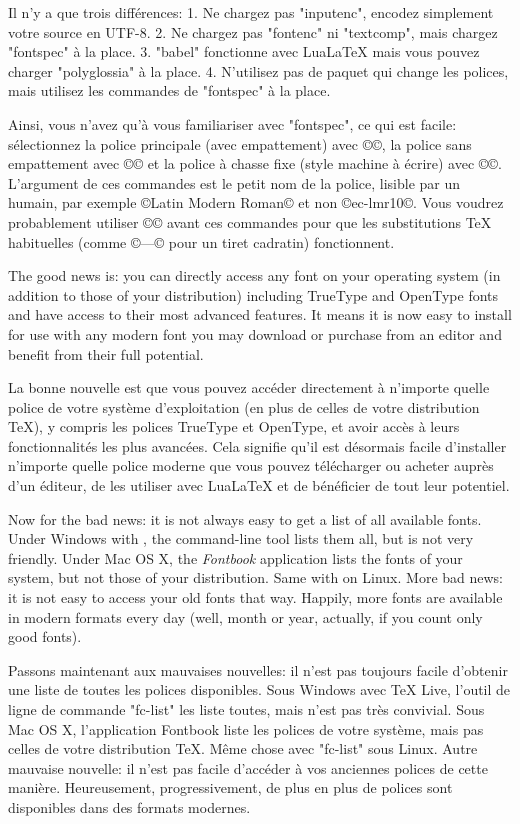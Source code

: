 \documentclass{lltxdoc}
\begin{document}
Il n'y a que trois différences:
1. Ne chargez pas "inputenc", encodez simplement votre source en UTF-8.
2. Ne chargez pas "fontenc" ni "textcomp", mais chargez "fontspec" à la place.
3. "babel" fonctionne avec LuaLaTeX mais vous pouvez charger "polyglossia" à la place.
4. N'utilisez pas de paquet qui change les polices, mais utilisez les commandes de "fontspec" à la place.

Ainsi, vous n'avez qu'à vous familiariser avec "fontspec", ce qui est facile: sélectionnez la police principale (avec empattement) avec ©\setmainfont©, la police sans empattement avec ©\setsansfont© et la police à chasse fixe (style machine à écrire) avec ©\setmonofont©. L'argument de ces commandes est le petit nom de la police, lisible par un humain, par exemple ©Latin Modern Roman© et non ©ec-lmr10©. Vous voudrez probablement utiliser ©© avant ces commandes pour que les substitutions TeX habituelles (comme ©---© pour un tiret cadratin) fonctionnent.

The good news is: you can directly access any font on your operating system
(in addition to those of your \tex distribution) including TrueType and
OpenType fonts and have access to their most advanced features. It means it
is now easy to install for use with \lualatex any modern font you may download
or purchase from an editor and benefit from their full potential.

La bonne nouvelle est que vous pouvez accéder directement à n'importe quelle police de votre système d'exploitation (en plus de celles de votre distribution TeX), y compris les polices TrueType et OpenType, et avoir accès à leurs fonctionnalités les plus avancées. Cela signifie qu'il est désormais facile d'installer n'importe quelle police moderne que vous pouvez télécharger ou acheter auprès d'un éditeur, de les utiliser avec LuaLaTeX et de bénéficier de tout leur potentiel.

Now for the bad news: it is not always easy to get a list of all available
fonts. Under Windows with \texlive, the command-line tool  lists
them all, but is not very friendly. Under Mac OS X, the \emph{Fontbook}
application lists the fonts of your system, but not those of your \tex
distribution. Same with  on Linux. More bad news: it is not easy
to access your old fonts that way. Happily, more fonts are available in modern
formats every day (well, month or year, actually, if you count only good
fonts).

Passons maintenant aux mauvaises nouvelles: il n'est pas toujours facile d'obtenir une liste de toutes les polices disponibles. Sous Windows avec TeX Live, l'outil de ligne de commande "fc-list" les liste toutes, mais n'est pas très convivial. Sous Mac OS X, l'application Fontbook liste les polices de votre système, mais pas celles de votre distribution TeX. Même chose avec "fc-list" sous Linux. Autre mauvaise nouvelle: il n'est pas facile d'accéder à vos anciennes polices de cette manière. Heureusement, progressivement, de plus en plus de polices sont disponibles dans des formats modernes.
\end{document}
